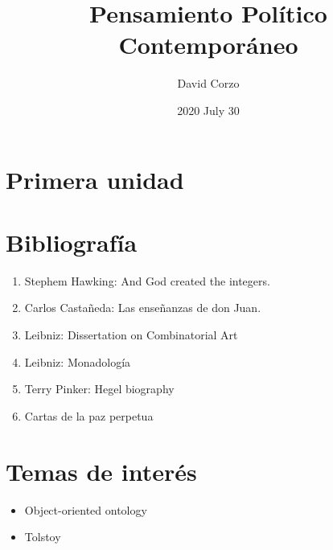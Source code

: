 \documentclass[openany]{book}
\title{Pensamiento Político Contemporáneo}
\date{2020 July 30} %
\author{David Corzo} %
\begin{document}
\maketitle

\chapter{Primera unidad}




\chapter{Bibliografía}
\begin{enumerate}
    \item Stephem Hawking: And God created the integers. 
    \item Carlos Castañeda: Las enseñanzas de don Juan.
    \item Leibniz: Dissertation on Combinatorial Art
    \item Leibniz: Monadología
    \item Terry Pinker: Hegel biography
    \item Cartas de la paz perpetua
\end{enumerate}

\chapter{Temas de interés}
\begin{itemize}
    \item Object-oriented ontology
    \item Tolstoy
\end{itemize}

\end{document}
